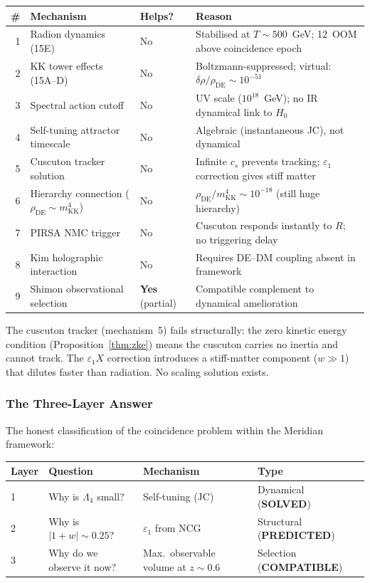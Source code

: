 \begin{center}
\small
\begin{tabular}{r l l l}
\hline
\# & Mechanism & Helps? & Reason \\
\hline
1 & Radion dynamics (15E)           & No & Stabilised at $T \sim 500$~GeV; 12~OOM above coincidence epoch \\
2 & KK tower effects (15A--D)       & No & Boltzmann-suppressed; virtual: $\delta\rho/\rho_{\mathrm{DE}} \sim 10^{-51}$ \\
3 & Spectral action cutoff          & No & UV scale ($10^{18}$~GeV); no IR dynamical link to $H_0$ \\
4 & Self-tuning attractor timescale & No & Algebraic (instantaneous JC), not dynamical \\
5 & Cuscuton tracker solution       & No & Infinite $c_s$ prevents tracking; $\varepsilon_1$ correction gives stiff matter \\
6 & Hierarchy connection ($\rho_{\mathrm{DE}} \sim m_{\mathrm{KK}}^4$) & No & $\rho_{\mathrm{DE}}/m_{\mathrm{KK}}^4 \sim 10^{-18}$ (still huge hierarchy) \\
7 & PIRSA NMC trigger               & No & Cuscuton responds instantly to $R$; no triggering delay \\
8 & Kim holographic interaction      & No & Requires DE--DM coupling absent in framework \\
9 & Shimon observational selection   & \textbf{Yes} (partial) & Compatible complement to dynamical amelioration \\
\hline
\end{tabular}
\end{center}

\noindent
The cuscuton tracker (mechanism~5) fails structurally: the zero kinetic energy condition (Proposition~\ref{thm:zke}) means the cuscuton carries no inertia and cannot track. The $\varepsilon_1 X$ correction introduces a stiff-matter component ($w \gg 1$) that dilutes faster than radiation. No scaling solution exists.

\subsubsection{The Three-Layer Answer}

The honest classification of the coincidence problem within the Meridian framework:

\begin{center}
\begin{tabular}{l l l l}
\hline
Layer & Question & Mechanism & Type \\
\hline
1 & Why is $\Lambda_4$ small? & Self-tuning (JC) & Dynamical (\textbf{SOLVED}) \\
2 & Why is $|1+w| \sim 0.25$? & $\varepsilon_1$ from NCG & Structural (\textbf{PREDICTED}) \\
3 & Why do we observe it now? & Max.\ observable volume at $z \sim 0.6$ & Selection (\textbf{COMPATIBLE}) \\
\hline
\end{tabular}
\end{center}

